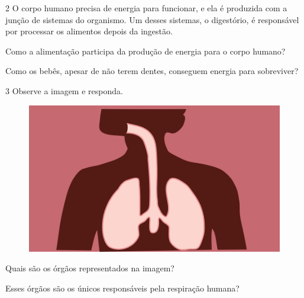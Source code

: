 \num{2} O corpo humano precisa de energia para funcionar, e ela é
produzida com a junção de sistemas do organismo. Um desses sistemas, o
digestório, é responsável por processar os alimentos depois da ingestão.

\begin{escolha}
\item Como a alimentação participa da produção de energia para o corpo humano?\\

\item Como os bebês, apesar de não terem dentes, conseguem energia para
sobreviver?\\
\end{escolha}

\pagebreak
\num{3} Observe a imagem e responda.

\begin{figure}[htpb!]
\includegraphics[width=.5\textwidth]{./imgs/img1.png}
\end{figure}

\begin{escolha}
\item Quais são os órgãos representados na imagem?\\

\item Esses órgãos são os únicos responsáveis pela respiração humana?\\
\end{escolha}


